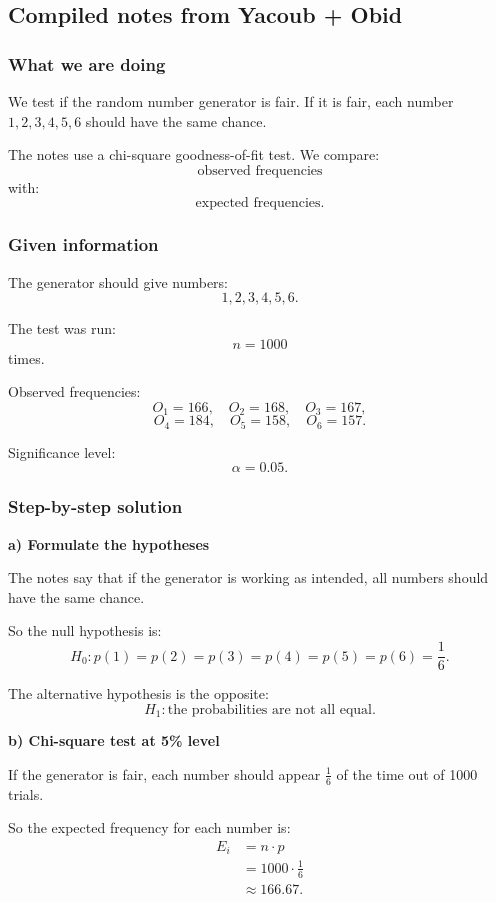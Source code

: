 \documentclass[10pt]{article}
\begin{document}
\subsection*{Compiled notes from Yacoub + Obid}

\subsubsection*{What we are doing}

We test if the random number generator is fair.
If it is fair, each number \(1,2,3,4,5,6\)
should have the same chance.

The notes use a chi-square goodness-of-fit test.
We compare:
\[
\text{observed frequencies}
\]
with:
\[
\text{expected frequencies}.
\]

\subsubsection*{Given information}

The generator should give numbers:
\[
1,2,3,4,5,6.
\]

The test was run:
\[
n=1000
\]
times.

Observed frequencies:
\[
O_1=166,\quad O_2=168,\quad O_3=167,
\]
\[
O_4=184,\quad O_5=158,\quad O_6=157.
\]

Significance level:
\[
\alpha=0.05.
\]

\subsubsection*{Step-by-step solution}

\textbf{a) Formulate the hypotheses}

The notes say that if the generator is working as
intended, all numbers should have the same chance.

So the null hypothesis is:
\[
H_0:
p(1)=p(2)=p(3)=p(4)=p(5)=p(6)
=\frac{1}{6}.
\]

The alternative hypothesis is the opposite:
\[
H_1:
\text{the probabilities are not all equal.}
\]

\textbf{b) Chi-square test at 5\% level}

If the generator is fair, each number should appear
\(\frac{1}{6}\) of the time out of 1000 trials.

So the expected frequency for each number is:
\begin{align*}
E_i
&=
n\cdot p
\\[2mm]
&=
1000\cdot \frac{1}{6}
\\[2mm]
&\approx 166.67.
\end{align*}
\end{document}
